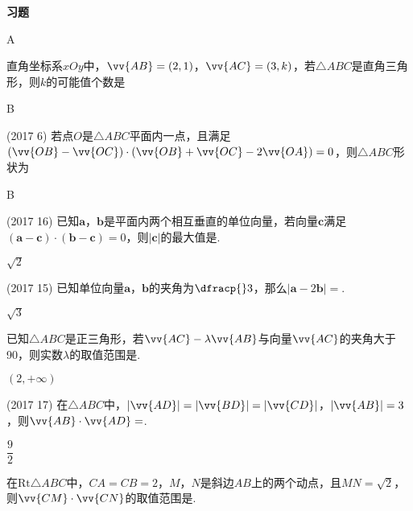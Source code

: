 \begin{exercise}{\textbf{习题}}
\begin{answer}
      A
    \end{answer}
  \item%
    直角坐标系$xOy$中，$\vv{AB}=(2,1)$，$\vv{AC}=(3,k)$，若$\triangle{ABC}$是直角三角形，则$k$的可能值个数是\xz
    \begin{answer}
      B
    \end{answer}
  \item%
    (2017  6)
    若点$O$是$\triangle{ABC}$平面内一点，且满足$(\vv{OB}-\vv{OC})\cdot(\vv{OB}+\vv{OC}-2\vv{OA})=0$，则$\triangle{ABC}$形状为\xz
    \begin{answer}
      B
    \end{answer}
  \item%
    (2017  16)
    已知$\bm a$，$\bm b$是平面内两个相互垂直的单位向量，若向量$\bm c$满足$(\bm a-\bm c)\cdot(\bm b-\bm c)=0$，则$|\bm c|$的最大值是\tk.
    \begin{answer}
      $\sqrt2$
    \end{answer}
  \item%
    (2017  15)
    已知单位向量$\bm a$，$\bm b$的夹角为$\dfracp{}3$，那么$|\bm a-2\bm b|=$\tk.
    \begin{answer}
      $\sqrt3$
    \end{answer}
  \item%
    已知$\triangle{ABC}$是正三角形，若$\vv{AC}-\lambda\vv{AB}$与向量$\vv{AC}$的夹角大于90\degree，则实数$\lambda$的取值范围是\tk.
    \begin{answer}
      $(2,+\infty)$
    \end{answer}
  \item%
    (2017  17)
    在$\triangle{ABC}$中，$|\vv{AD}|=|\vv{BD}|=|\vv{CD}|$，$|\vv{AB}|=3$，则$\vv{AB}\cdot\vv{AD}=$\tk.
    \begin{answer}
      $\dfrac92$
    \end{answer}
  \item%
    在$\mathrm{Rt}\triangle{ABC}$中，$CA=CB=2$，$M$，$N$是斜边$AB$上的两个动点，且$MN=\sqrt{2}$，则$\vv{CM}\cdot\vv{CN}$的取值范围是\tk.

\end{exercise}

